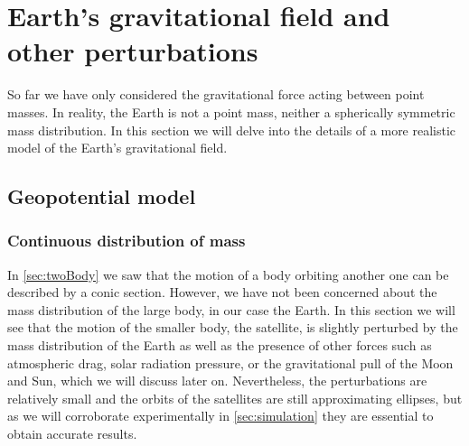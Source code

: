 \documentclass[../main.tex]{subfiles}
\begin{document}
\section{Earth's gravitational field and other perturbations}\label{sec:force}
So far we have only considered the gravitational force acting between point masses. In reality, the Earth is not a point mass, neither a spherically symmetric mass distribution. In this section we will delve into the details of a more realistic model of the Earth's gravitational field.
\subsection{Geopotential model}
\subsubsection{Continuous distribution of mass}
In \cref{sec:twoBody} we saw that the motion of a body orbiting another one can be described by a conic section. However, we have not been concerned about the mass distribution of the large body, in our case the Earth. In this section we will see that the motion of the smaller body, the satellite, is slightly perturbed by the mass distribution of the Earth as well as the presence of other forces such as atmospheric drag, solar radiation pressure, or the gravitational pull of the Moon and Sun, which we will discuss later on. Nevertheless, the perturbations are relatively small and the orbits of the satellites are still approximating ellipses, but as we will corroborate experimentally in \cref{sec:simulation} they are essential to obtain accurate results.
\end{document}
